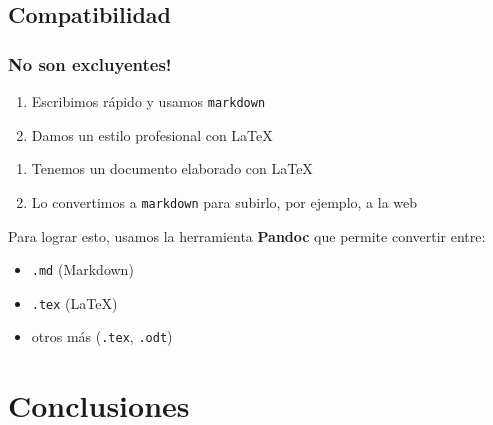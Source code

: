 \documentclass[svgnames]{beamer}
\begin{document}
\subsection{Compatibilidad}

\begin{frame}
  \frametitle{No son excluyentes!}
  \begin{enumerate}
    \item Escribimos rápido y usamos \texttt{markdown}
    \item Damos un estilo profesional con \LaTeX
  \end{enumerate}\pause
  \begin{enumerate}
    \item Tenemos un documento elaborado con \LaTeX
    \item Lo convertimos a \texttt{markdown} para subirlo, por ejemplo, a la web
  \end{enumerate}\pause
  Para lograr esto, usamos la herramienta \textbf{Pandoc} que permite convertir entre:
  \begin{itemize}
   \item \texttt{.md} (Markdown)
   \item \texttt{.tex} (\LaTeX)
   \item otros más (\texttt{.tex}, \texttt{.odt})
  \end{itemize}

\end{frame}

\section{Conclusiones}
\end{document}
